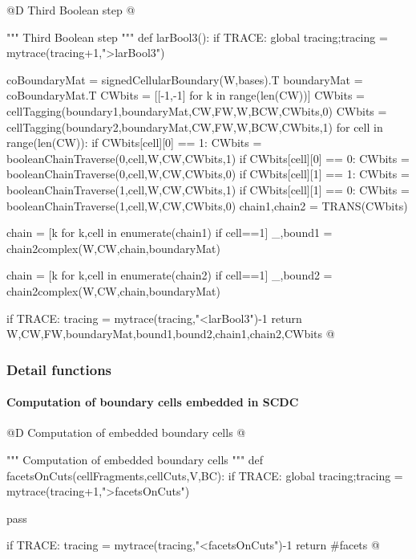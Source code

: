 \documentclass[11pt,oneside]{article}	%
\begin{document}
@D Third Boolean step
@{""" Third Boolean step """
def larBool3():
	if TRACE: global tracing;tracing = mytrace(tracing+1,">larBool3")

	coBoundaryMat = signedCellularBoundary(W,bases).T
	boundaryMat = coBoundaryMat.T
	CWbits = [[-1,-1] for k in range(len(CW))]
	CWbits = cellTagging(boundary1,boundaryMat,CW,FW,W,BCW,CWbits,0)
	CWbits = cellTagging(boundary2,boundaryMat,CW,FW,W,BCW,CWbits,1)
	for cell in range(len(CW)):
		if CWbits[cell][0] == 1:
			CWbits = booleanChainTraverse(0,cell,W,CW,CWbits,1)		
		if CWbits[cell][0] == 0:
			CWbits = booleanChainTraverse(0,cell,W,CW,CWbits,0)
		if CWbits[cell][1] == 1:
			CWbits = booleanChainTraverse(1,cell,W,CW,CWbits,1)
		if CWbits[cell][1] == 0:
			CWbits = booleanChainTraverse(1,cell,W,CW,CWbits,0)
	chain1,chain2 = TRANS(CWbits)
	
	chain = [k for k,cell in enumerate(chain1) if cell==1]
	_,bound1 = chain2complex(W,CW,chain,boundaryMat)
	
	chain = [k for k,cell in enumerate(chain2) if cell==1]
	_,bound2 = chain2complex(W,CW,chain,boundaryMat)
	

	if TRACE: tracing = mytrace(tracing,"<larBool3")-1
	return W,CW,FW,boundaryMat,bound1,bound2,chain1,chain2,CWbits
@}

\subsubsection{Detail functions}



\paragraph{Computation of boundary cells embedded in SCDC}

@D Computation of embedded boundary cells
@{""" Computation of embedded boundary cells """
def facetsOnCuts(cellFragments,cellCuts,V,BC):
	if TRACE: global tracing;tracing = mytrace(tracing+1,">facetsOnCuts")



	pass

	if TRACE: tracing = mytrace(tracing,"<facetsOnCuts")-1
	return #facets
@}
\end{document}
